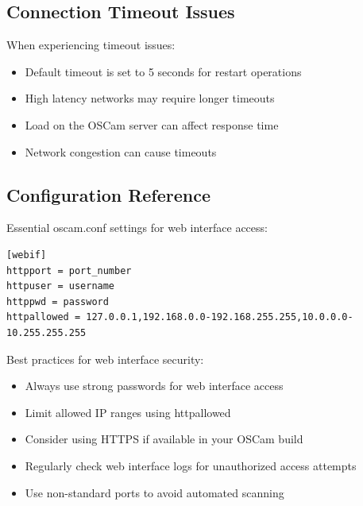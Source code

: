 \documentclass[a4paper,11pt]{report}
\begin{document}
\subsection{Connection Timeout Issues}
\begin{notebox}
When experiencing timeout issues:
\begin{itemize}
    \item Default timeout is set to 5 seconds for restart operations
    \item High latency networks may require longer timeouts
    \item Load on the OSCam server can affect response time
    \item Network congestion can cause timeouts
\end{itemize}
\end{notebox}

\subsection{Configuration Reference}
Essential oscam.conf settings for web interface access:
\begin{verbatim}
[webif]
httpport = port_number
httpuser = username
httppwd = password
httpallowed = 127.0.0.1,192.168.0.0-192.168.255.255,10.0.0.0-10.255.255.255
\end{verbatim}

\begin{tipbox}
Best practices for web interface security:
\begin{itemize}
    \item Always use strong passwords for web interface access
    \item Limit allowed IP ranges using httpallowed
    \item Consider using HTTPS if available in your OSCam build
    \item Regularly check web interface logs for unauthorized access attempts
    \item Use non-standard ports to avoid automated scanning
\end{itemize}
\end{tipbox}
\end{document}
